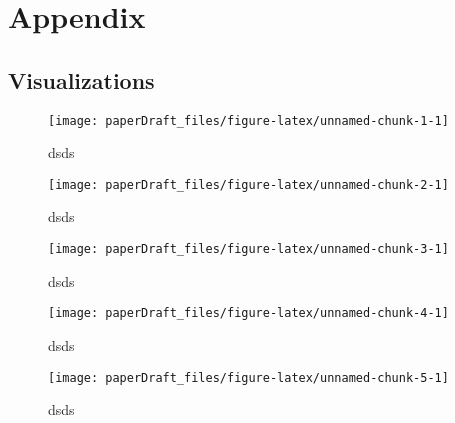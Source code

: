 \documentclass[
  10pt,
  dvipsnames,enabledeprecatedfontcommands]{scrartcl}
\begin{document}
\newpage
\appendix

\hypertarget{appendix}{%
\section{Appendix}\label{appendix}}

\hypertarget{visualizations}{%
\subsection{Visualizations}\label{visualizations}}

\label{appendix:visualizations}

\begin{figure}[H]


\begin{center}\texttt{[image: paperDraft\_files/figure-latex/unnamed-chunk-1-1]} \end{center}
\caption{dsds}
\label{fig:weat7google}
\end{figure}

\begin{figure}[H]


\begin{center}\texttt{[image: paperDraft\_files/figure-latex/unnamed-chunk-2-1]} \end{center}
\caption{dsds}
\label{fig:weat7glove}
\end{figure}

\begin{figure}[H]


\begin{center}\texttt{[image: paperDraft\_files/figure-latex/unnamed-chunk-3-1]} \end{center}
\caption{dsds}
\label{fig:weat7reddit}
\end{figure}

\begin{figure}[H]


\begin{center}\texttt{[image: paperDraft\_files/figure-latex/unnamed-chunk-4-1]} \end{center}
\caption{dsds}
\label{fig:weat1google}
\end{figure}

\begin{figure}[H]


\begin{center}\texttt{[image: paperDraft\_files/figure-latex/unnamed-chunk-5-1]} \end{center}
\caption{dsds}
\label{fig:weat1glove}
\end{figure}
\end{document}
